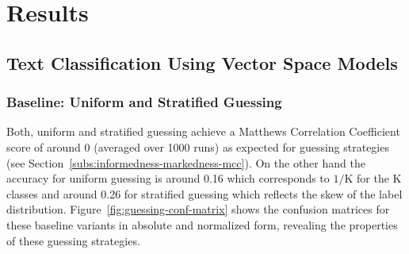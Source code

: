 


\clearpage

\section{Results}
\label{sec:Results}

\subsection{Text Classification Using Vector Space Models}
\label{sub:Text Classification Using Vector Space Models}

\subsubsection{Baseline: Uniform and Stratified Guessing}
\label{subs:baselines-classifiers}

Both, uniform and stratified guessing achieve a Matthews Correlation Coefficient score of around 0 (averaged over 1000 runs) as expected for guessing strategies (see Section~\ref{subs:informedness-markedness-mcc}). On the other hand the accuracy for uniform guessing is around 0.16 which corresponds to $1/\text{K}$ for the K classes and around 0.26 for stratified guessing which reflects the skew of the label distribution.
Figure~\ref{fig:guessing-conf-matrix} shows the confusion matrices for these baseline variants in absolute and normalized form, revealing the properties of these guessing strategies.

